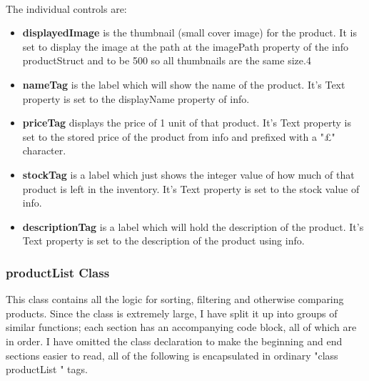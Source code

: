 ﻿\documentclass{article}
\begin{document}
    \paragraph{}
    The individual controls are:
    \begin{itemize}
        \item \textbf{displayedImage} is the thumbnail (small cover image) for the product.
        It is set to display the image at the path at the imagePath property of the info productStruct and to be 500 so all thumbnails are the same size.4
        \item \textbf{nameTag} is the label which will show the name of the product.
        It's Text property is set to the displayName property of info.
        \item \textbf{priceTag} displays the price of 1 unit of that product.
        It's Text property is set to the stored price of the product from info and prefixed with a "£" character.
        \item \textbf{stockTag} is a label which just shows the integer value of how much of that product is left in the inventory.
        It's Text property is set to the stock value of info.
        \item \textbf{descriptionTag} is a label which will hold the description of the product.
        It's Text property is set to the description of the product using info.
    \end{itemize}
    \newpage
    \subsubsection{productList Class}
    This class contains all the logic for sorting, filtering and otherwise comparing products.
    Since the class is extremely large, I have split it up into groups of similar functions; each section has an accompanying code block, all of which are in order.
    I have omitted the class declaration to make the beginning and end sections easier to read, all of the following is encapsulated in ordinary "class productList {}" tags.
\end{document}
